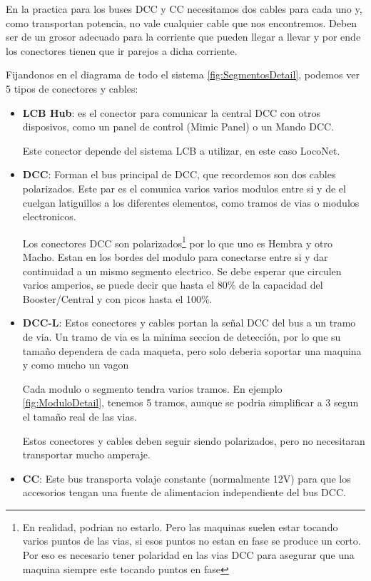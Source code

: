 En la practica para los buses DCC y CC necesitamos dos cables para cada uno y, como transportan potencia, no vale cualquier cable que nos encontremos. Deben ser de un grosor adecuado para la corriente que pueden llegar a llevar y por ende los conectores tienen que ir parejos a dicha corriente. 

Fijandonos en el diagrama de todo el sistema \ref{fig:SegmentosDetail}, podemos ver 5 tipos de conectores y cables:
\begin{itemize}
	\item \textbf{LCB Hub}: es el conector para comunicar la central DCC con otros disposivos, como un panel de control (Mimic Panel) o un Mando DCC.

	Este conector depende del sistema LCB a utilizar, en este caso LocoNet.
	\item \textbf{DCC}: Forman el bus principal de DCC, que recordemos son dos cables polarizados. Este par es el comunica varios varios modulos entre si y de el cuelgan latiguillos a los diferentes elementos, como tramos de vias o modulos electronicos.

Los conectores DCC son polarizados\footnote{En realidad, podrian no estarlo. Pero las maquinas suelen estar tocando varios puntos de las vias, si esos puntos no estan en fase se produce un corto. Por eso es necesario tener polaridad en las vias DCC para asegurar que una maquina siempre este tocando puntos en fase} por lo que uno es Hembra y otro Macho. Estan en los bordes del modulo para conectarse entre si y dar continuidad a un mismo segmento electrico. Se debe esperar que circulen varios amperios, se puede decir que hasta el 80\% de la capacidad del Booster/Central y con picos hasta el 100\%.
\item \textbf{DCC-L}: Estos conectores y cables portan la señal DCC del bus a un tramo de via. Un tramo de via es la minima seccion de detección, por lo que su tamaño dependera de cada maqueta, pero solo deberia soportar una maquina y como mucho un vagon

Cada modulo o segmento tendra varios tramos. En ejemplo \ref{fig:ModuloDetail}, tenemos 5 tramos, aunque se podria simplificar a 3 segun el tamaño real de las vias.

Estos conectores y cables deben seguir siendo polarizados, pero no necesitaran transportar mucho amperaje.

\item \textbf{CC}: Este bus transporta volaje constante (normalmente 12V) para que los accesorios tengan una fuente de alimentacion independiente del bus DCC. 
\end{itemize}
